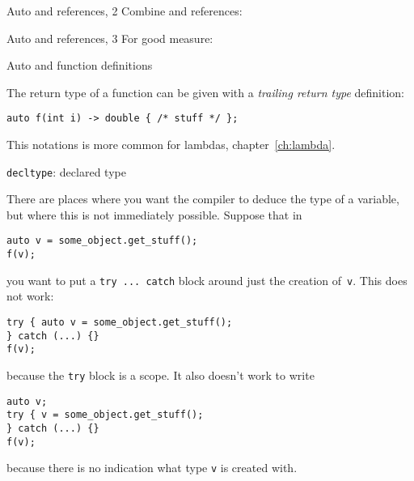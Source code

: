 \begin{block}{Auto and references, 2}
  \label{sl:auto-ref2}
  Combine  and references:
\end{block}

\begin{block}{Auto and references, 3}
  \label{sl:auto-ref3}
  For good measure:
  \lstset{numbers=left,numberstyle=\tiny}
\end{block}

\begin{comment}
  \begin{block}{Auto plus}
    \label{sl:auto-plus-const}
    Keywords like \n{const} and the reference character~\n{\&} can be
    added:
\begin{lstlisting}
// class member
  some_object my_object;
// class method:
  some_object &get_some_object() { return my_object; };
// main program:
auto object_copy  = thing.get_some_object();
auto &object_mutable  = thing.get_some_object();
const auto &object_immutable  = thing.get_some_object();
\end{lstlisting}
  \end{block}
\end{comment}

 {Auto and function definitions}

The return type of a function can be given with a
\emph{trailing return type}
definition:
\begin{lstlisting}
auto f(int i) -> double { /* stuff */ };
\end{lstlisting}
This notations is more common for lambdas, chapter~\ref{ch:lambda}.

 {\texttt{decltype}: declared type}

There are places where you want the compiler to deduce the type of a
variable, but where this is not immediately possible. Suppose that in
\begin{lstlisting}
auto v = some_object.get_stuff();
f(v);
\end{lstlisting}
you want to put a \lstinline{try ... catch} block around just the
creation of~\lstinline{v}. This does not work:
\begin{lstlisting}
try { auto v = some_object.get_stuff(); 
} catch (...) {}
f(v);
\end{lstlisting}
because the \lstinline{try} block is a scope. It also doesn't work to write
\begin{lstlisting}
auto v;
try { v = some_object.get_stuff(); 
} catch (...) {}
f(v);
\end{lstlisting}
because there is no indication what type \lstinline{v} is created
with.


